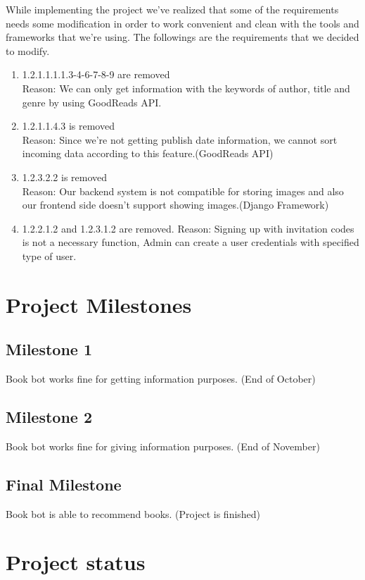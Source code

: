 \documentclass[a4paper]{article}
\begin{document}
\qquad While implementing the project we've realized that some of the requirements needs some modification in order to work convenient and clean with the tools and frameworks that we're using. The followings are the requirements that we decided to modify. 
\begin{enumerate}

 	\item 1.2.1.1.1.1.3-4-6-7-8-9 are removed\\
 	Reason: We can only get information with the keywords of author, title and genre by using GoodReads API.
 	
 	\item 1.2.1.1.4.3 is removed \\
 	Reason: Since we're not getting publish date information, we cannot sort incoming data according to this feature.(GoodReads API)
 	
    \item 1.2.3.2.2 is removed \\
    Reason: Our backend system is not compatible for storing images and also our frontend side doesn't support showing images.(Django Framework)
    
    \item 1.2.2.1.2 and 1.2.3.1.2 are removed. 
    Reason: Signing up with invitation codes is not a necessary function, Admin can create a user credentials with specified type of user.
    
 			
 \end{enumerate}


\section{Project Milestones}
\subsection{Milestone 1}
Book bot works fine for getting information purposes. (End of October)
\subsection{Milestone 2}
Book bot works fine for giving information purposes. (End of November)
\subsection{Final Milestone}
Book bot is able to recommend books. (Project is finished)

\section{Project status}
\end{document}
